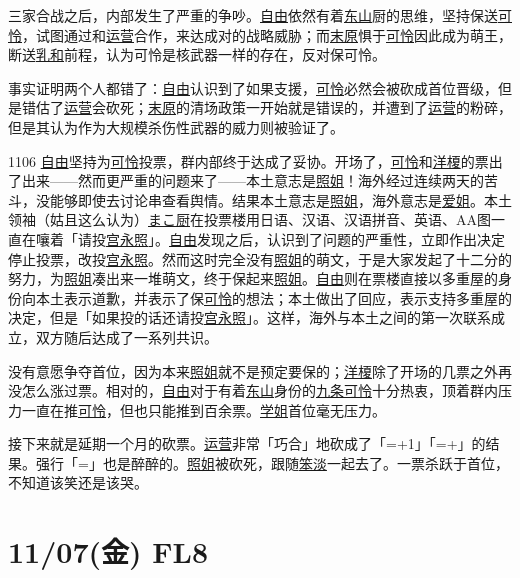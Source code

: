 三家合战之后，内部发生了严重的争吵。\uline{自由}依然有着\uline{东山}厨的思维，坚持保送\uline{可怜}，试图通过和\uline{运营}合作，来达成对的战略威胁；而\uline{末原}惧于\uline{可怜}因此成为萌王，断送\uline{乳和}前程，认为可怜是核武器一样的存在，反对保可怜。

事实证明两个人都错了：\uline{自由}认识到了如果支援，\uline{可怜}必然会被砍成首位晋级，但是错估了\uline{运营}会砍死；\uline{末原}的清场政策一开始就是错误的，并遭到了\uline{运营}的粉碎，但是其认为作为大规模杀伤性武器的威力则被验证了。

1106 \uline{自由}坚持为\uline{可怜}投票，群内部终于达成了妥协。开场了，\uline{可怜}和\uline{洋榎}的票出了出来——然而更严重的问题来了——本土意志是\uline{照姐}！海外经过连续两天的苦斗，没能够即使去讨论串查看舆情。结果本土意志是\uline{照姐}，海外意志是\uline{爱姐}。本土领袖（姑且这么认为）\uline{まこ厨}在投票楼用日语、汉语、汉语拼音、英语、AA图一直在嚷着「请投\uline{宫永照}」。\uline{自由}发现之后，认识到了问题的严重性，立即作出决定停止投票，改投\uline{宫永照}。然而这时完全没有\uline{照姐}的萌文，于是大家发起了十二分的努力，为\uline{照姐}凑出来一堆萌文，终于保起来\uline{照姐}。\uline{自由}则在票楼直接以多重屋的身份向本土表示道歉，并表示了保\uline{可怜}的想法；本土做出了回应，表示支持多重屋的决定，但是「如果投的话还请投\uline{宫永照}」。这样，海外与本土之间的第一次联系成立，双方随后达成了一系列共识。

没有意愿争夺首位，因为本来\uline{照姐}就不是预定要保的；\uline{洋榎}除了开场的几票之外再没怎么涨过票。相对的，\uline{自由}对于有着\uline{东山}身份的\uline{九条可怜}十分热衷，顶着群内压力一直在推\uline{可怜}，但也只能推到百余票。\uline{学姐}首位毫无压力。

接下来就是延期一个月的砍票。\uline{运营}非常「巧合」地砍成了「=+1」「=+」的结果。强行「=」也是醉醉的。\uline{照姐}被砍死，跟随\uline{笨淡}一起去了。一票杀跃于首位，不知道该笑还是该哭。
\newpage
\section{11/07(金) FL8}



